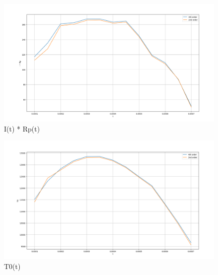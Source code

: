 \documentclass[12pt,a4paper]{scrartcl}
\begin{document}
	\begin{figure}[H]
		\centering
		\includegraphics[width=\linewidth]{../4}
		\caption{I(t) * Rp(t)}
		\label{fig:4}
	\end{figure}

	 \begin{figure}[H]
	 	\centering
	 	\includegraphics[width=\linewidth]{../6}
	 	\caption[T0(t)]{T0(t)}
	 	\label{fig:6}
	 \end{figure}
	 
\end{document}
